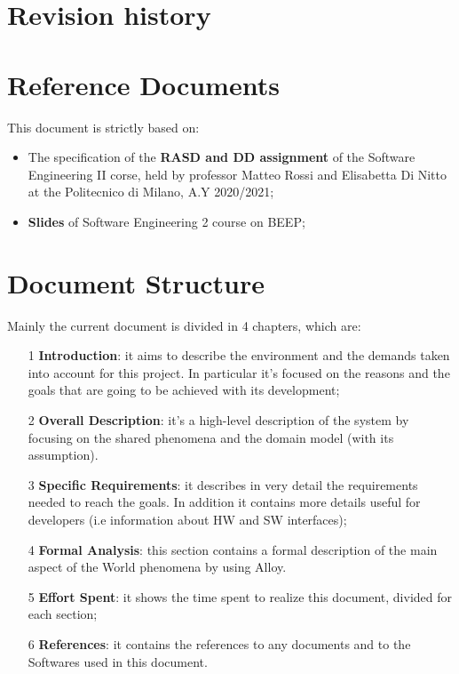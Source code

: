 \section{Revision history}

\section{Reference Documents}
This document is strictly based on:
\begin{itemize}
\item The specification of the \textbf{RASD and DD assignment} of the Software Engineering II corse, held by professor Matteo Rossi and Elisabetta Di Nitto at the Politecnico di Milano, A.Y 2020/2021;
\item \textbf{Slides} of Software Engineering 2 course on BEEP;
\end{itemize}
\section{Document Structure}
Mainly the current document is divided in 4 chapters, which are:
\begin{itemize}
\item[1]\textbf{Introduction}: it aims to describe the environment and the demands taken into account for this project. In particular it's focused on the reasons and the goals that are going to be achieved with its development;
\item[2]\textbf{Overall Description}: it's a high-level description of the system by focusing on the shared phenomena and the domain model (with its assumption). 
\item[3]\textbf{Specific Requirements}: it describes in very detail the requirements needed to reach the goals. In addition it contains more details useful for developers (i.e information about HW and SW interfaces);
\item[4]\textbf{Formal Analysis}: this section contains a formal description of the main aspect of the World phenomena by using Alloy. 
\item[5]\textbf{Effort Spent}: it shows the time spent to realize this document, divided for each section;
\item[6]\textbf{References}: it contains the references to any documents and to the Softwares used in this document.
\end{itemize}


